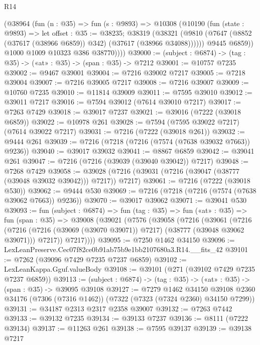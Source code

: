 \begin{lexlean}{R14}
\begin{coremodule}
          (@38964
            (fun (n : @35) =>
            fun (s : @9893) =>
            @10308
              (@10190
                (fun (state : @9893) =>
                let offset : @35 := @38235;
                @38319
                  (@38321
                    (@9810 (@7647 (@8852 (@37617 (@38966 @6859)) @342) (@37617 (@38966 @34088))))))
                @9445
                @6859))
            @1000
            @1009
            @10323
            @386
            @38770))))
@39000 := (subject : @6874) -> (tag : @35) -> («at» : @35) -> (span : @35) -> @7212
@39001 := @10757 @7235
@39002 := @9467 @39001
@39004 := @7216 @39002 @7217
@39005 := @7218 @39004
@39007 := @7216 @39005 @7217
@39008 := @7216 @39007
@39009 := @10760 @7235
@39010 := @11814 @39009
@39011 := @7595 @39010
@39012 := @39011 @7217
@39016 := @7594 @39012 (@7614 @39010 @7217)
@39017 := @7263 @7429
@39018 := @39017 @7237
@39021 := @39016 (@7222 (@39018 @6859))
@39022 := @10978 @261
@39028 := @7594 (@7595 @39022 @7217) (@7614 @39022 @7217)
@39031 := @7216 (@7222 (@39018 @261))
@39032 := @9444 @261
@39039 := @7216 (@7218 (@7216 (@7574 (@7638 @39032 @7663)) @9236))
@39040 := @39017 @39032
@39041 := @8867 @6859
@39042 := @39041 @261
@39047 := @7216 (@7216 (@39039 (@39040 @39042)) @7217)
@39048 := @7268 @7429
@39058 := @39028 (@7216 (@39031 (@7216 (@39047 (@38777 (@39048 @39032 @39042))) @7217)) @7217)
@39061 := @7216 (@7222 (@39018 @530))
@39062 := @9444 @530
@39069 := @7216 (@7218 (@7216 (@7574 (@7638 @39062 @7663)) @9236))
@39070 := @39017 @39062
@39071 := @39041 @530
@39093 := fun (subject : @6874) =>
  fun (tag : @35) =>
  fun («at» : @35) =>
  fun (span : @35) =>
  @39008
    (@39021
      (@7576
        (@39058
          (@7216
            (@39061
              (@7216
                (@7216 (@7216 (@39069 (@39070 @39071)) @7217) (@38777 (@39048 @39062 @39071)))
                @7217))
            @7217))))
@39095 := @7250 @1462 @34150
@39096 := LexLeanPreserve.Cec07f82ce0b91ab75b9e1bb2107680a3.R14.__fits_42
@39101 := @7262 (@39096 @7429 @7235 @7237 @6859)
@39102 := LexLeanKappa.Gguf.valueBody
@39108 := @39101 (@271 (@39102 @7429 @7235 @7237 @6859))
@39113 := (subject : @6874) -> (tag : @35) -> («at» : @35) -> (span : @35) -> @39095 @39108
@39127 := @7279
    @1462
    @34150
    @39108
    @2360
    @34176
    (@7306 (@7316 @1462))
    (@7322 (@7323 (@7324 @2360) @34150 @7299))
@39131 := @34187 @2313 @2317 @2358 @39007
@39132 := @7263 @7442
@39133 := @39132 @7235
@39134 := @39133 @7237
@39136 := @8111 (@7222 @39134)
@39137 := @11263 @261
@39138 := @7595 @39137
@39139 := @39138 @7217

\end{coremodule}
\end{lexlean}
